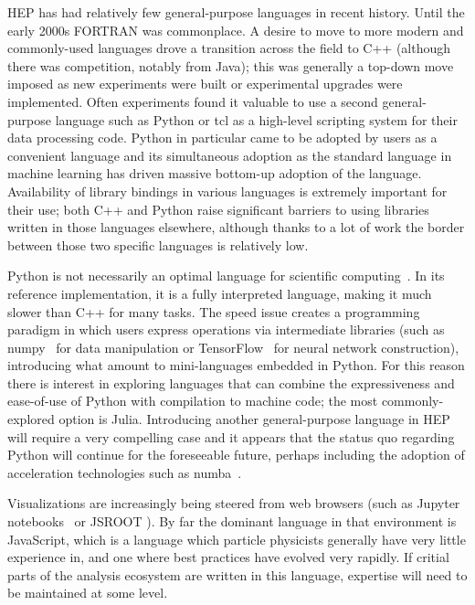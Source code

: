 HEP has had relatively few general-purpose languages in recent history. Until the early 2000s FORTRAN was commonplace. A desire to move to more modern and commonly-used languages drove a transition across the field to C++ (although there was competition, notably from Java); this was generally a top-down move imposed as new experiments were built or experimental upgrades were implemented. Often experiments found it valuable to use a second general-purpose language such as Python or tcl as a high-level scripting system for their data processing code. Python in particular came to be adopted by users as a convenient language and its simultaneous adoption as the standard language in machine learning has driven massive bottom-up adoption of the language. Availability of library bindings in various languages is extremely important for their use; both C++ and Python raise significant barriers to using libraries written in those languages elsewhere, although thanks to a lot of work the border between those two specific languages is relatively low.

Python is not necessarily an optimal language for scientific computing~\cite{876288}. In its reference implementation, it is a fully interpreted language, making it much slower than C++ for many tasks. The speed issue creates a programming paradigm in which users express operations via intermediate libraries (such as numpy~\cite{harris2020array} for data manipulation or TensorFlow~\cite{tensorflow_developers_2022_6574269} for neural network construction), introducing what amount to mini-languages embedded in Python. For this reason there is interest in exploring languages that can combine the expressiveness and ease-of-use of Python with compilation to machine code; the most commonly-explored option is Julia. Introducing another general-purpose language in HEP will require a very compelling case and it appears that the status quo regarding Python will continue for the foreseeable future, perhaps including the adoption of acceleration technologies such as numba~\cite{10.1145/2833157.2833162}.

Visualizations are increasingly being steered from web browsers (such as Jupyter notebooks~\cite{soton403913} or JSROOT \cite{JSROOT}). By far the dominant language in that environment is JavaScript, which is a language which particle physicists generally have very little experience in, and one where best practices have evolved very rapidly. If critial parts of the analysis ecosystem are written in this language, expertise will need to be maintained at some level.


